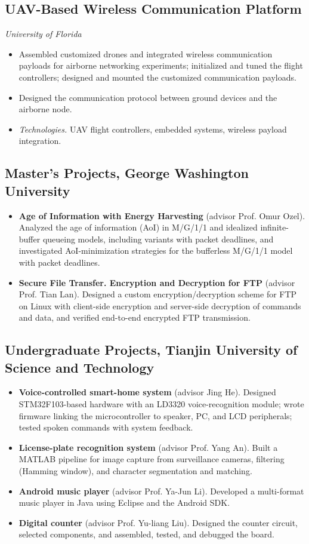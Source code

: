 \documentclass[10pt]{article}
\newcommand{\proj}[2]{\subsection*{#1}{\small\itshape #2}\par}
\newcommand{\tech}[1]{\item \textit{Technologies.} #1}
\begin{document}
\proj{UAV-Based Wireless Communication Platform}{University of Florida}
\begin{itemize}
\item Assembled customized drones and integrated wireless communication payloads for airborne networking experiments; initialized and tuned the flight controllers; designed and mounted the customized communication payloads.
\item Designed the communication protocol between ground devices and the airborne node.
\tech{UAV flight controllers, embedded systems, wireless payload integration.}
\end{itemize}

\subsection*{Master's Projects, George Washington University}
\begin{itemize}
\item \textbf{Age of Information with Energy Harvesting} (advisor Prof. Omur Ozel). Analyzed the age of information (AoI) in M/G/1/1 and idealized infinite-buffer queueing models, including variants with packet deadlines, and investigated AoI-minimization strategies for the bufferless M/G/1/1 model with packet deadlines.
\item \textbf{Secure File Transfer. Encryption and Decryption for FTP} (advisor Prof. Tian Lan). Designed a custom encryption/decryption scheme for FTP on Linux with client-side encryption and server-side decryption of commands and data, and verified end-to-end encrypted FTP transmission.
\end{itemize}

\subsection*{Undergraduate Projects, Tianjin University of Science and Technology}
\begin{itemize}
\item \textbf{Voice-controlled smart-home system} (advisor Jing He). Designed STM32F103-based hardware with an LD3320 voice-recognition module; wrote firmware linking the microcontroller to speaker, PC, and LCD peripherals; tested spoken commands with system feedback.
\item \textbf{License-plate recognition system} (advisor Prof. Yang An). Built a MATLAB pipeline for image capture from surveillance cameras, filtering (Hamming window), and character segmentation and matching.
\item \textbf{Android music player} (advisor Prof. Ya-Jun Li). Developed a multi-format music player in Java using Eclipse and the Android SDK.
\item \textbf{Digital counter} (advisor Prof. Yu-liang Liu). Designed the counter circuit, selected components, and assembled, tested, and debugged the board.
\end{itemize}
\end{document}

